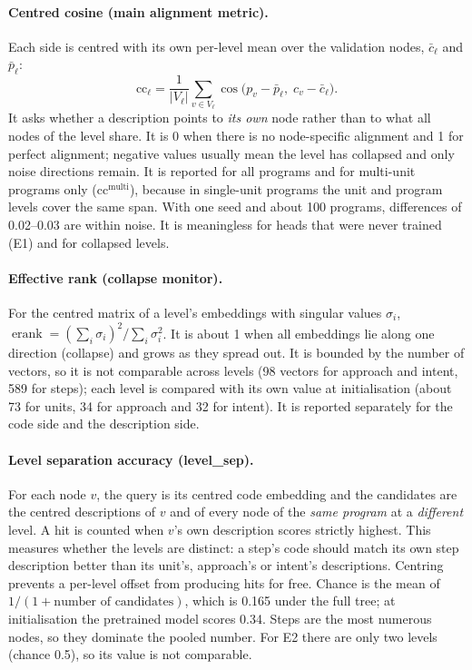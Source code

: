 \documentclass[11pt]{article}
\begin{document}
\paragraph{Centred cosine (main alignment metric).}
Each side is centred with its own per-level mean over the validation nodes, $\bar c_\ell$ and $\bar p_\ell$:
\begin{equation}
\text{cc}_\ell = \frac{1}{|V_\ell|}\sum_{v\in V_\ell}\cos\bigl(p_v-\bar p_\ell,\; c_v-\bar c_\ell\bigr).
\end{equation}
It asks whether a description points to \emph{its own} node rather than to what all nodes of the level share. It is
0 when there is no node-specific alignment and 1 for perfect alignment; negative values usually mean the level has
collapsed and only noise directions remain. It is reported for all programs and for multi-unit programs only
($\text{cc}^{\text{multi}}$), because in single-unit programs the unit and program levels cover the same span. With
one seed and about 100 programs, differences of 0.02--0.03 are within noise. It is meaningless for heads that were
never trained (E1) and for collapsed levels.

\paragraph{Effective rank (collapse monitor).}
For the centred matrix of a level's embeddings with singular values $\sigma_i$,
$\operatorname{erank}=(\sum_i\sigma_i)^2/\sum_i\sigma_i^2$. It is about 1 when all embeddings lie along one
direction (collapse) and grows as they spread out. It is bounded by the number of vectors, so it is not comparable
across levels (98 vectors for approach and intent, 589 for steps); each level is compared with its own value at
initialisation (about 73 for units, 34 for approach and 32 for intent). It is reported separately for the code side
and the description side.

\paragraph{Level separation accuracy (level\_sep).}
For each node $v$, the query is its centred code embedding and the candidates are the centred descriptions of $v$
and of every node of the \emph{same program} at a \emph{different} level. A hit is counted when $v$'s own
description scores strictly highest. This measures whether the levels are distinct: a step's code should match its
own step description better than its unit's, approach's or intent's descriptions. Centring prevents a per-level
offset from producing hits for free. Chance is the mean of $1/(1+\text{number of candidates})$, which is 0.165 under
the full tree; at initialisation the pretrained model scores 0.34. Steps are the most numerous nodes, so they
dominate the pooled number. For E2 there are only two levels (chance 0.5), so its value is not comparable.
\end{document}
